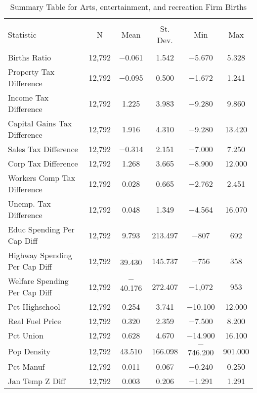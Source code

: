 
\begin{table}[!htbp] \centering 
  \caption{Summary Table for  Arts, entertainment, and recreation Firm Births} 
  \label{71summary} 
\begin{tabular}{@{\extracolsep{5pt}}lccccc} 
\\[-1.8ex]\hline 
\hline \\[-1.8ex] 
Statistic & \multicolumn{1}{c}{N} & \multicolumn{1}{c}{Mean} & \multicolumn{1}{c}{St. Dev.} & \multicolumn{1}{c}{Min} & \multicolumn{1}{c}{Max} \\ 
\hline \\[-1.8ex] 
Births Ratio & 12,792 & $-$0.061 & 1.542 & $-$5.670 & 5.328 \\ 
Property Tax Difference & 12,792 & $-$0.095 & 0.500 & $-$1.672 & 1.241 \\ 
Income Tax Difference & 12,792 & 1.225 & 3.983 & $-$9.280 & 9.860 \\ 
Capital Gains Tax Difference & 12,792 & 1.916 & 4.310 & $-$9.280 & 13.420 \\ 
Sales Tax Difference & 12,792 & $-$0.314 & 2.151 & $-$7.000 & 7.250 \\ 
Corp Tax Difference & 12,792 & 1.268 & 3.665 & $-$8.900 & 12.000 \\ 
Workers Comp Tax Difference & 12,792 & 0.028 & 0.665 & $-$2.762 & 2.451 \\ 
Unemp. Tax Difference & 12,792 & 0.048 & 1.349 & $-$4.564 & 16.070 \\ 
Educ Spending Per Cap Diff & 12,792 & 9.793 & 213.497 & $-$807 & 692 \\ 
Highway Spending Per Cap Diff & 12,792 & $-$39.430 & 145.737 & $-$756 & 358 \\ 
Welfare Spending Per Cap Diff & 12,792 & $-$40.176 & 272.407 & $-$1,072 & 953 \\ 
Pct Highschool & 12,792 & 0.254 & 3.741 & $-$10.100 & 12.000 \\ 
Real Fuel Price & 12,792 & 0.320 & 2.359 & $-$7.500 & 8.200 \\ 
Pct Union & 12,792 & 0.628 & 4.670 & $-$14.900 & 16.100 \\ 
Pop Density & 12,792 & 43.510 & 166.098 & $-$746.200 & 901.000 \\ 
Pct Manuf & 12,792 & 0.011 & 0.067 & $-$0.240 & 0.250 \\ 
Jan Temp Z Diff & 12,792 & 0.003 & 0.206 & $-$1.291 & 1.291 \\ 

\end{tabular}
\end{table}
